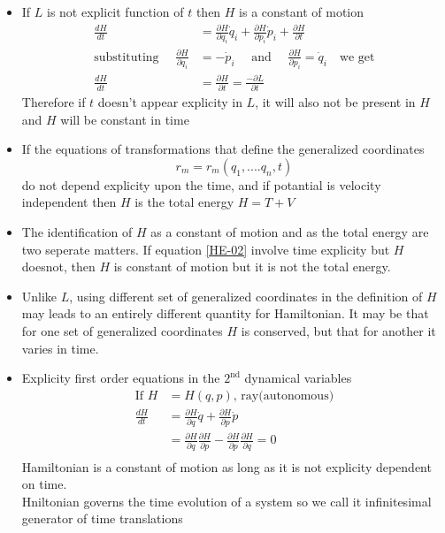 \begin{itemize}
	\item If $L$ is not explicit function of $t$ then $H$ is a constant of motion 
	\begin{align*}
	\frac{d H}{d t}&=\frac{\partial H}{\partial q_{i}} \dot{q}_{i}+\frac{\partial H}{\partial p_{i}} \dot{p}_{i}+\frac{\partial H}{\partial t}\\\text{substituting }\quad\frac{\partial H}{\partial q_{i}} &=-\dot{p}_{i}\quad\text{ and }\quad\frac{\partial H}{\partial p_{i}} =\dot{q}_{i}\quad\text{we get}\\
	\frac{d H}{d t}&=\frac{\partial H}{\partial t}=\frac{-\partial L}{\partial t}
	\end{align*}
	Therefore if $t$ doesn't appear explicity in $L$, it will also not be present in $H$ and $H$ will be constant in time
	\item If the equations of transformations that define the generalized coordinates
	\begin{equation}
	r_m=r_m(q_1,....q_n,t)\label{HE-02}
	\end{equation}
	do not depend explicity upon the time, and if potantial is velocity independent then $H$ is the total energy $H=T+V$
	\item The identification of $H$ as a constant of motion and as the total energy are two seperate matters. If equation \ref{HE-02} involve time explicity but $H$ doesnot, then $H$ is constant of motion but it is not the total energy.
	\item Unlike $L$, using different set of generalized coordinates in the definition of $H$ may leads to an entirely different quantity for Hamiltonian. It may be that for one set of generalized coordinates $H$ is conserved, but that for another it varies in time.
	\item Explicity first order equations in the $2^{\text{nd}}$ dynamical variables
	\begin{align*}
	\text{If }H&=H(q,p)\text{, ray(autonomous)}\\
	\frac{dH}{dt}&=\frac{\partial H}{\partial q}\dot{q} +\frac{\partial H}{\partial p}\dot{p}\\
	&=\frac{\partial H}{\partial q}\frac{\partial H}{\partial p}-\frac{\partial H}{\partial p}\frac{\partial H}{\partial q}=0\\
	\end{align*}
	Hamiltonian is a constant of motion as long as it is not explicity dependent on time.\\
	Hniltonian governs the time evolution of a system so we call it infinitesimal generator of time translations
\end{itemize}
